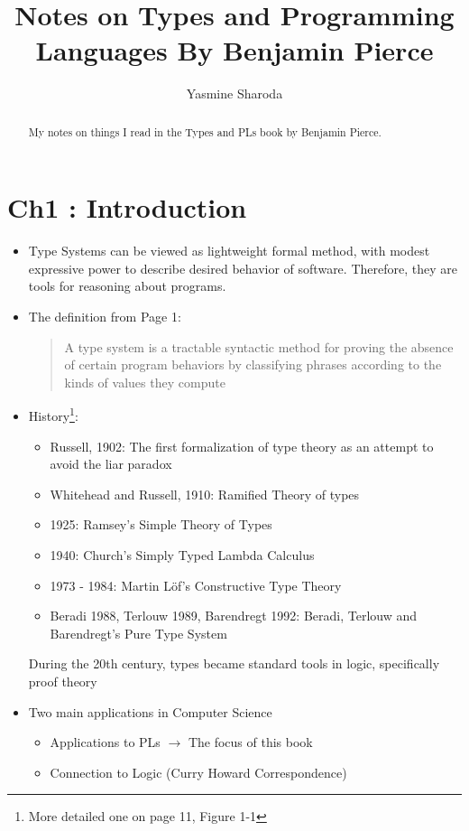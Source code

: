 \documentclass[fleqn]{article}
\title{Notes on Types and Programming Languages By Benjamin Pierce}
\author{Yasmine Sharoda}
\begin{document}
\maketitle

\begin{abstract}
My notes on things I read in the Types and PLs book by Benjamin Pierce. 
\end{abstract}

\section{Ch1 : Introduction}
\begin{itemize}
\item Type Systems can be viewed as lightweight formal method, with modest expressive power to describe desired behavior of software. Therefore, they are tools for reasoning about programs.  
\item The definition from Page 1:
\begin{quotation}
	A type system is a tractable syntactic method for proving the absence of certain program behaviors by classifying phrases according to the kinds of values they compute
\end{quotation}
\item History\footnote{More detailed one on page 11, Figure 1-1}: 
  \begin{itemize}
  	\item Russell, 1902: The first formalization of type theory as an attempt to avoid the liar paradox 
  	\item Whitehead and Russell, 1910: Ramified Theory of types 
  	\item 1925: Ramsey's Simple Theory of Types 
  	\item 1940: Church's Simply Typed Lambda Calculus 
  	\item 1973 - 1984: Martin L\"of's Constructive Type Theory 
  	\item Beradi 1988, Terlouw 1989, Barendregt 1992: Beradi, Terlouw and Barendregt's Pure Type System 
  \end{itemize}
During the 20th century, types became standard tools in logic, specifically proof theory 
\item Two main applications in Computer Science 
	\begin{itemize}
		\item Applications to PLs $\rightarrow$ The focus of this book 
		\item Connection to Logic (Curry Howard Correspondence)

\end{itemize}
\end{itemize}
\end{document}
